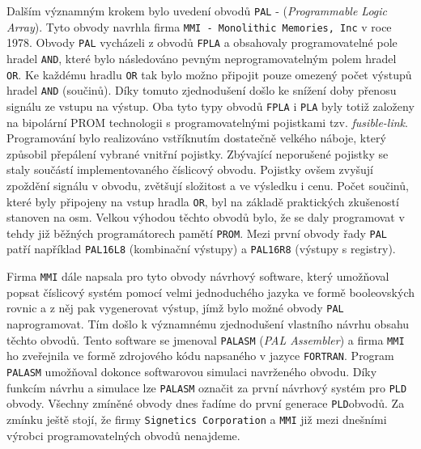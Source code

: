 {      Dalším významným krokem bylo uvedení obvodů \texttt{PAL} - (\emph{Programmable Logic Array}).
      Tyto obvody navrhla firma \texttt{MMI - Monolithic Memories, Inc} v roce 1978. Obvody
      \texttt{PAL} vycházeli z obvodů \texttt{FPLA} a obsahovaly programovatelné pole hradel
      \texttt{AND}, které bylo následováno pevným neprogramovatelným polem hradel \texttt{OR}. Ke
      každému hradlu \texttt{OR} tak bylo možno připojit pouze omezený počet výstupů hradel
      \texttt{AND} (součinů). Díky tomuto zjednodušení došlo ke snížení doby přenosu signálu ze
      vstupu na výstup. Oba tyto typy obvodů \texttt{FPLA} i \texttt{PLA} byly totiž založeny na
      bipolární PROM technologii s programovatelnými pojistkami tzv. \emph{fusible-link}.
      Programování bylo realizováno vstříknutím dostatečně velkého náboje, který způsobil přepálení
      vybrané vnitřní pojistky. Zbývající neporušené pojistky se staly součástí implementovaného
      číslicový obvodu. Pojistky ovšem zvyšují zpoždění signálu v obvodu, zvětšují složitost a ve
      výsledku i cenu. Počet součinů, které byly připojeny na vstup hradla \texttt{OR}, byl na
      základě praktických zkušeností stanoven na osm. Velkou výhodou těchto obvodů bylo, že se daly
      programovat v tehdy již běžných programátorech pamětí \texttt{PROM}. Mezi první obvody řady
      \texttt{PAL} patří například \texttt{PAL16L8} (kombinační výstupy) a \texttt{PAL16R8}
      (výstupy s registry).
      
      Firma \texttt{MMI} dále napsala pro tyto obvody návrhový software, který umožňoval popsat
      číslicový systém pomocí velmi jednoduchého jazyka ve formě booleovských rovnic a z něj pak
      vygenerovat výstup, jímž bylo možné obvody \texttt{PAL} naprogramovat. Tím došlo k významnému
      zjednodušení vlastního návrhu obsahu těchto obvodů. Tento software se jmenoval
      \texttt{PALASM} (\emph{PAL Assembler}) a firma \texttt{MMI} ho zveřejnila ve formě zdrojového
      kódu napsaného v jazyce \texttt{FORTRAN}. Program \texttt{PALASM} umožňoval dokon\-ce
      softwarovou simulaci navrženého obvodu. Díky funkcím návrhu a simulace  lze \texttt{PALASM}
      označit za první návrhový systém pro \texttt{PLD} obvody. Všechny zmíněné obvody dnes řadíme
      do první generace \texttt{PLD}obvodů. Za zmínku ještě stojí, že firmy \texttt{Signetics
      Corporation} a \texttt{MMI} již mezi dnešními výrobci programovatelných obvodů nenajdeme.
      
}
